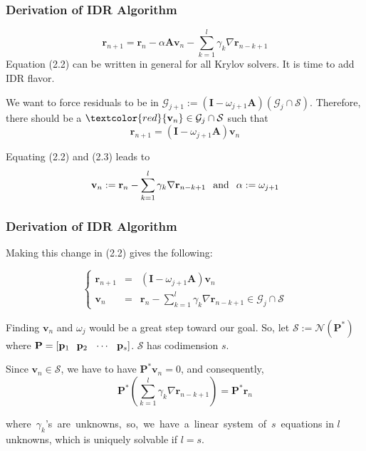 \documentclass[mathserif]{beamer}
\begin{document}
\begin{frame}
\frametitle{Derivation of IDR Algorithm}
\begin{equation}\tag{2.2} \mathbf{r}_{n+1} =\mathbf{r}_n-\alpha \mathbf{A} \mathbf{v}_n-\sum \limits_ {k=1}^l \gamma_k \nabla \mathbf{r}_{n-k+1} \end{equation}
Equation (2.2) can be written in general for all Krylov solvers. It is time to add IDR flavor.\\
\pause

\vspace{.1in}We want to force residuals to be in $\mathcal{G}_{j+1}:=(\mathbf{I}-\omega_{j+1}\mathbf{A})(\mathcal{G}_{j}\cap \mathcal{S})$. 
Therefore, there should be a $\textcolor{red}{\mathbf{v}_n} \in \mathcal{G}_j\cap \mathcal{S}$ such that \begin{equation}\tag{2.3}\mathbf{r}_{n+1}=(\mathbf{I}-\omega_{j+1}\mathbf{A})\mathbf{v}_n\end{equation}


\pause
Equating (2.2) and (2.3) leads to \[\mathbf{v}_n := \mathbf{r}_n-\sum \limits_ {k=1}^l \gamma_k \nabla \mathbf{r}_{n-k+1} \hspace{.1in} \text{and}  \hspace{.1in} \alpha:=\omega_{j+1}\]  
\end{frame}


\begin{frame}
\frametitle{Derivation of IDR Algorithm}
Making this change in (2.2) gives the following:

\[\left\{ \tag{2.4}\begin{array}{llll} \mathbf{r}_{n+1} &=& (\mathbf{I}-\omega_{j+1} \mathbf{A}) \mathbf{v}_n\\ \mathbf{v}_n&=&\mathbf{r}_n-\sum \limits_ {k=1}^l \gamma_k \nabla \mathbf{r}_{n-k+1} \in \mathcal{G}_j\cap \mathcal{S}\end{array}\right.\]

\pause
Finding $\mathbf{v}_n$ and $\omega_j$ would be a great step toward our goal. So, let $\mathcal{S}:=\mathcal{N}(\mathbf{P}^*)$ where $\mathbf{P}=[\mathbf{p}_1 \hspace{.1in} \mathbf{p}_2 \hspace{.1in}  \cdots \hspace{.1in}  \mathbf{p}_s]$.  $\mathcal{S}$ has codimension $s$.
\vspace{.1in}

\pause
Since $\mathbf{v}_n \in \mathcal{S}$, we have to have $\mathbf{P}^*\mathbf{v}_n=0$, and consequently, \\
\[\mathbf{P}^*(\sum \limits_ {k=1}^l \gamma_k \nabla \mathbf{r}_{n-k+1}) =\mathbf{P}^*\mathbf{r}_n\]

\pause
\mbox{where $\gamma_k$'s are unknowns, so, we have a linear system of $s$ equations} in $l$ unknowns, which is uniquely solvable if $l=s.$
\end{frame}
\end{document}
